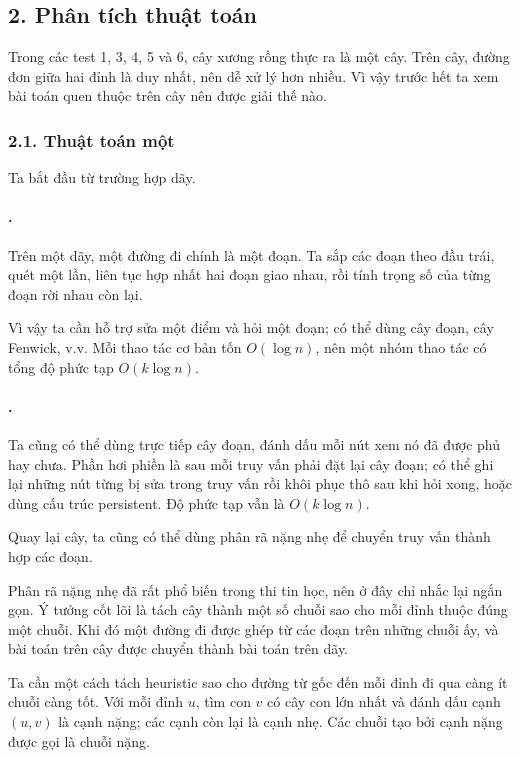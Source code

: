 \documentclass[11pt]{article}
\begin{document}
\subsection*{2. Phân tích thuật toán}

Trong các test 1, 3, 4, 5 và 6, cây xương rồng thực ra là một cây. Trên cây,
đường đơn giữa hai đỉnh là duy nhất, nên dễ xử lý hơn nhiều. Vì vậy trước hết
ta xem bài toán quen thuộc trên cây nên được giải thế nào.

\subsubsection*{2.1. Thuật toán một}

Ta bắt đầu từ trường hợp dãy.

\paragraph{.}
Trên một dãy, một đường đi chính là một đoạn. Ta sắp các đoạn theo đầu trái,
quét một lần, liên tục hợp nhất hai đoạn giao nhau, rồi tính trọng số của từng
đoạn rời nhau còn lại.

Vì vậy ta cần hỗ trợ sửa một điểm và hỏi một đoạn; có thể dùng cây đoạn, cây
Fenwick, v.v. Mỗi thao tác cơ bản tốn \(O(\log n)\), nên một nhóm thao tác có
tổng độ phức tạp \(O(k\log n)\).

\paragraph{.}
Ta cũng có thể dùng trực tiếp cây đoạn, đánh dấu mỗi nút xem nó đã được phủ
hay chưa. Phần hơi phiền là sau mỗi truy vấn phải đặt lại cây đoạn; có thể ghi
lại những nút từng bị sửa trong truy vấn rồi khôi phục thô sau khi hỏi xong,
hoặc dùng cấu trúc persistent. Độ phức tạp vẫn là \(O(k\log n)\).

Quay lại cây, ta cũng có thể dùng phân rã nặng nhẹ để chuyển truy vấn thành
hợp các đoạn.

Phân rã nặng nhẹ đã rất phổ biến trong thi tin học, nên ở đây chỉ nhắc lại
ngắn gọn. Ý tưởng cốt lõi là tách cây thành một số chuỗi sao cho mỗi đỉnh
thuộc đúng một chuỗi. Khi đó một đường đi được ghép từ các đoạn trên những
chuỗi ấy, và bài toán trên cây được chuyển thành bài toán trên dãy.

Ta cần một cách tách heuristic sao cho đường từ gốc đến mỗi đỉnh đi qua càng
ít chuỗi càng tốt. Với mỗi đỉnh \(u\), tìm con \(v\) có cây con lớn nhất và
đánh dấu cạnh \((u,v)\) là cạnh nặng; các cạnh còn lại là cạnh nhẹ. Các chuỗi
tạo bởi cạnh nặng được gọi là chuỗi nặng.
\end{document}
